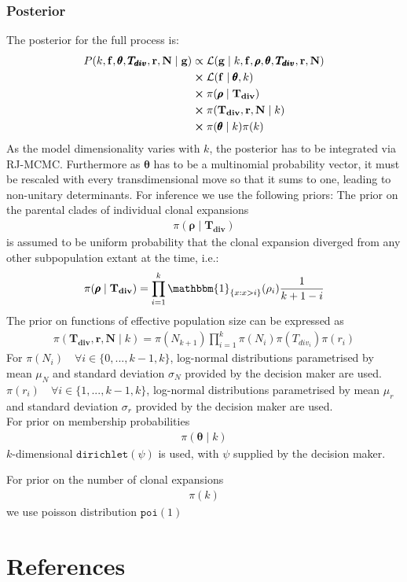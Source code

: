 \documentclass{report}
\theoremstyle{definition}
\begin{document}
\subsection{Posterior}
The posterior for the full process is:
\begin{gather}
\begin{aligned}
P(k, \mathbf{f}, \pmb{\theta}, \pmb{T_{div}}, \mathbf{r}, \mathbf{N}\mid\mathbf{g}) &\propto \mathcal{L}(\mathbf{g}\mid k, \mathbf{f}, \pmb{\rho}, \pmb{\theta}, \pmb{T_{div}}, \mathbf{r}, \mathbf{N})\\
&\cross \mathcal{L}(\mathbf{f}\mid\pmb{\theta}, k)\\
&\cross \pi(\pmb{\rho}\mid\mathbf{T_{div}})\\
&\cross \pi(\mathbf{T_{div}}, \mathbf{r}, \mathbf{N}\mid k)\\
&\cross\pi(\pmb{\theta}\mid k)\pi(k)
\end{aligned}
\end{gather}
As the model dimensionality varies with $k$, the posterior has to be integrated via RJ-MCMC. Furthermore as $\pmb{\theta}$ has to be a multinomial probability vector, it must be rescaled with every transdimensional move so that it sums to one, leading to non-unitary determinants. For inference we use the following priors:
The prior on the parental clades of individual clonal expansions
\begin{gather}
\pi(\pmb{\rho}\mid \mathbf{T_{div}}) 
\end{gather}
is assumed to be uniform probability that the clonal expansion diverged from any other subpopulation extant at the time, i.e.:
\begin{gather}
\pi(\pmb{\rho}\mid \mathbf{T_{div}}) = \prod\limits_{i=1}^{k} \mathbbm{1}_{\{x:x>i\}}(\rho_i)\frac{1}{k+1-i}  
\end{gather}
The prior on functions of effective population size can be expressed as
\begin{gather}
\pi(\mathbf{T_{div}}, \mathbf{r}, \mathbf{N}\mid k) = \pi(N_{k+1})\prod\limits_{i=1}^{k}\pi(N_i)\pi(T_{div_i})\pi(r_i)
\end{gather}
For $\pi(N_i)\quad \forall i\in\{0,...,k-1,k\}$, log-normal distributions parametrised by mean $\mu_N$ and standard deviation $\sigma_N$ provided by the decision maker are used.\\
$\pi(r_i)\quad \forall i\in\{1,...,k-1,k\}$, log-normal distributions parametrised by mean $\mu_r$ and standard deviation $\sigma_r$ provided by the decision maker are used.\\
For prior on membership probabilities
\begin{gather}
\pi(\pmb{\theta}\mid k)
\end{gather}
$k$-dimensional $\texttt{dirichlet}(\psi)$ is used, with $\psi$ supplied by the decision maker.

For prior on the number of clonal expansions
\begin{gather}
\pi(k)
\end{gather}
we use poisson distribution $\texttt{poi}(1)$
\chapter{References}
\printbibliography
\end{document}
